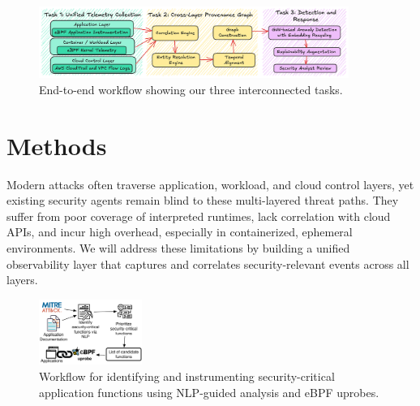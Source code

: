 \begin{figure}[t!]
    \centering \includegraphics[width=0.90\textwidth]{fig/arch.png}
    \caption{End-to-end workflow showing our three interconnected tasks.}
    \label{fig:arch}
    \end{figure}



\section*{Methods}

 Modern attacks often traverse application, workload, and cloud control layers, yet existing security agents remain blind to these multi-layered threat paths. They suffer from poor coverage of interpreted runtimes, lack correlation with cloud APIs, and incur high overhead, especially in containerized, ephemeral environments. We will address these limitations by building a unified observability layer that captures and correlates security-relevant events across all layers.

\begin{figure}
    \centering \includegraphics[width=0.30\textwidth]{fig/uprobe-chain.pdf}
    \caption{Workflow for identifying and instrumenting security-critical application functions using NLP-guided analysis and eBPF uprobes.}
    \label{fig:example:uprobe}
    \vspace{-2ex}
\end{figure}

